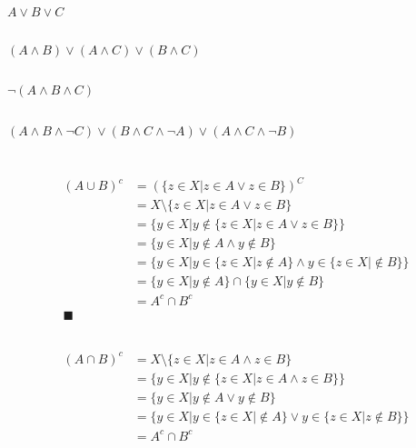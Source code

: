 \documentclass{article}
\begin{document}
    \subsection{}
    $A \lor B \lor C$
    \subsection{}
    $(A \land B) \lor (A \land C) \lor (B \land C)$
    \subsection{}
    $\neg (A \land B \land C)$
    \subsection{}
    $(A\land B \land \neg C) \lor (B \land C \land \neg A)
    \lor (A \land C \land \neg B)$
    \section{}
    \subsection{}
    \begin{align*}
        (A\cup B)^c &= (\{z\in X | z \in A \lor z \in B\})^C\\
        &= X \setminus \{z\in X | z \in A \lor z \in B\}\\
        &=\{y \in X | y \notin \{z\in X | z \in A \lor z \in B\}\}\\
        &=\{y \in X | y \notin A \land y \notin B\}\\
        &=\{y \in X | y \in \{z \in X | z \notin A\} \land y \in \{z \in X | \notin B\}\}\\
        &=\{y \in X | y \notin A\} \cap \{y \in X | y \notin B\}\\
        &= A^c \cap B^c\\
        \blacksquare
    \end{align*}
    \subsection{}
    \begin{align*}
        (A\cap B)^c &= X \setminus \{z \in X | z \in A \land z \in B\}\\
        &= \{y \in X | y \notin \{z \in X | z \in A \land z \in B\}\}\\
        &= \{y \in X | y \notin A \lor y \notin B\}\\
        &= \{y \in X | y \in \{z \in X |\notin A\} \lor y \in \{z \in X | z \notin B\} \}\\
        &= A^c \cap B^c
    \end{align*}
\end{document}
